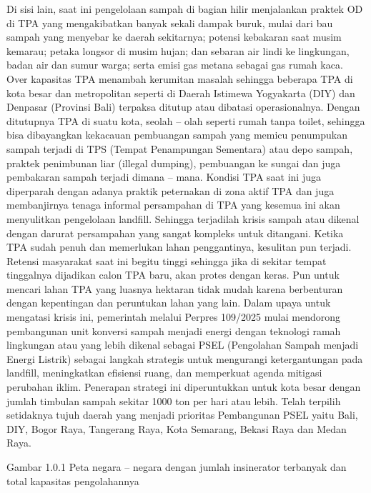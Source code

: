 \documentclass[
  letterpaper,
  DIV=11,
  numbers=noendperiod]{scrreprt}
\begin{document}
Di sisi lain, saat ini pengelolaan sampah di bagian hilir menjalankan
praktek OD di TPA yang mengakibatkan banyak sekali dampak buruk, mulai
dari bau sampah yang menyebar ke daerah sekitarnya; potensi kebakaran
saat musim kemarau; petaka longsor di musim hujan; dan sebaran air lindi
ke lingkungan, badan air dan sumur warga; serta emisi gas metana sebagai
gas rumah kaca. Over kapasitas TPA menambah kerumitan masalah sehingga
beberapa TPA di kota besar dan metropolitan seperti di Daerah Istimewa
Yogyakarta (DIY) dan Denpasar (Provinsi Bali) terpaksa ditutup atau
dibatasi operasionalnya. Dengan ditutupnya TPA di suatu kota, seolah --
olah seperti rumah tanpa toilet, sehingga bisa dibayangkan kekacauan
pembuangan sampah yang memicu penumpukan sampah terjadi di TPS (Tempat
Penampungan Sementara) atau depo sampah, praktek penimbunan liar
(illegal dumping), pembuangan ke sungai dan juga pembakaran sampah
terjadi dimana -- mana. Kondisi TPA saat ini juga diperparah dengan
adanya praktik peternakan di zona aktif TPA dan juga membanjirnya tenaga
informal persampahan di TPA yang kesemua ini akan menyulitkan
pengelolaan landfill. Sehingga terjadilah krisis sampah atau dikenal
dengan darurat persampahan yang sangat kompleks untuk ditangani. Ketika
TPA sudah penuh dan memerlukan lahan penggantinya, kesulitan pun
terjadi. Retensi masyarakat saat ini begitu tinggi sehingga jika di
sekitar tempat tinggalnya dijadikan calon TPA baru, akan protes dengan
keras. Pun untuk mencari lahan TPA yang luasnya hektaran tidak mudah
karena berbenturan dengan kepentingan dan peruntukan lahan yang lain.
Dalam upaya untuk mengatasi krisis ini, pemerintah melalui Perpres
109/2025 mulai mendorong pembangunan unit konversi sampah menjadi energi
dengan teknologi ramah lingkungan atau yang lebih dikenal sebagai PSEL
(Pengolahan Sampah menjadi Energi Listrik) sebagai langkah strategis
untuk mengurangi ketergantungan pada landfill, meningkatkan efisiensi
ruang, dan memperkuat agenda mitigasi perubahan iklim. Penerapan
strategi ini diperuntukkan untuk kota besar dengan jumlah timbulan
sampah sekitar 1000 ton per hari atau lebih. Telah terpilih setidaknya
tujuh daerah yang menjadi prioritas Pembangunan PSEL yaitu Bali, DIY,
Bogor Raya, Tangerang Raya, Kota Semarang, Bekasi Raya dan Medan Raya.

Gambar 1.0.1 Peta negara -- negara dengan jumlah insinerator terbanyak
dan total kapasitas pengolahannya
\end{document}

